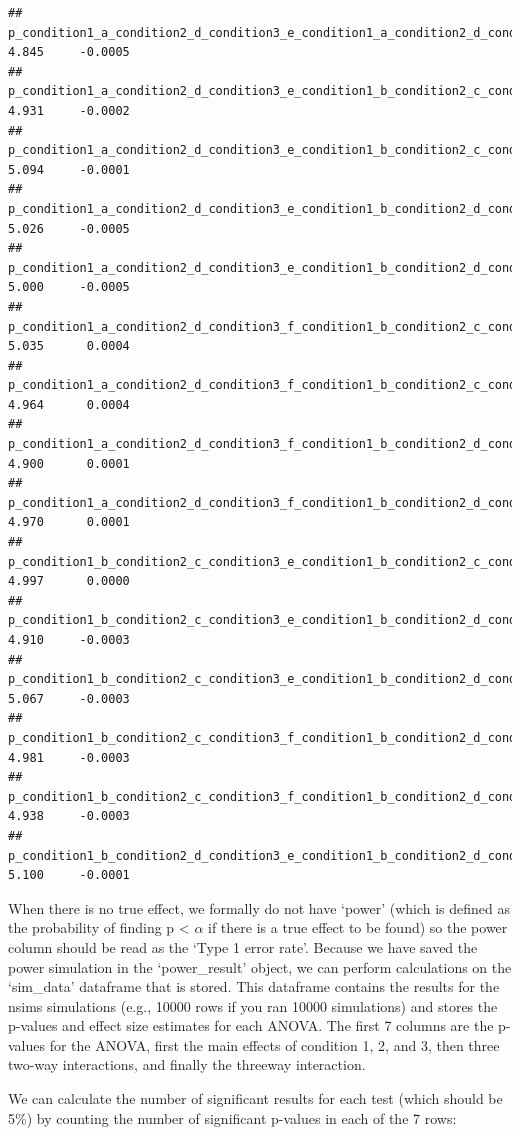 \documentclass[]{article}
\begin{document}
\begin{verbatim}
## p_condition1_a_condition2_d_condition3_e_condition1_a_condition2_d_condition3_f 4.845     -0.0005
## p_condition1_a_condition2_d_condition3_e_condition1_b_condition2_c_condition3_e 4.931     -0.0002
## p_condition1_a_condition2_d_condition3_e_condition1_b_condition2_c_condition3_f 5.094     -0.0001
## p_condition1_a_condition2_d_condition3_e_condition1_b_condition2_d_condition3_e 5.026     -0.0005
## p_condition1_a_condition2_d_condition3_e_condition1_b_condition2_d_condition3_f 5.000     -0.0005
## p_condition1_a_condition2_d_condition3_f_condition1_b_condition2_c_condition3_e 5.035      0.0004
## p_condition1_a_condition2_d_condition3_f_condition1_b_condition2_c_condition3_f 4.964      0.0004
## p_condition1_a_condition2_d_condition3_f_condition1_b_condition2_d_condition3_e 4.900      0.0001
## p_condition1_a_condition2_d_condition3_f_condition1_b_condition2_d_condition3_f 4.970      0.0001
## p_condition1_b_condition2_c_condition3_e_condition1_b_condition2_c_condition3_f 4.997      0.0000
## p_condition1_b_condition2_c_condition3_e_condition1_b_condition2_d_condition3_e 4.910     -0.0003
## p_condition1_b_condition2_c_condition3_e_condition1_b_condition2_d_condition3_f 5.067     -0.0003
## p_condition1_b_condition2_c_condition3_f_condition1_b_condition2_d_condition3_e 4.981     -0.0003
## p_condition1_b_condition2_c_condition3_f_condition1_b_condition2_d_condition3_f 4.938     -0.0003
## p_condition1_b_condition2_d_condition3_e_condition1_b_condition2_d_condition3_f 5.100     -0.0001
\end{verbatim}

When there is no true effect, we formally do not have `power' (which is
defined as the probability of finding p \textless{} \(\alpha\) if there
is a true effect to be found) so the power column should be read as the
`Type 1 error rate'. Because we have saved the power simulation in the
`power\_result' object, we can perform calculations on the `sim\_data'
dataframe that is stored. This dataframe contains the results for the
nsims simulations (e.g., 10000 rows if you ran 10000 simulations) and
stores the p-values and effect size estimates for each ANOVA. The first
7 columns are the p-values for the ANOVA, first the main effects of
condition 1, 2, and 3, then three two-way interactions, and finally the
threeway interaction.

We can calculate the number of significant results for each test (which
should be 5\%) by counting the number of significant p-values in each of
the 7 rows:
\end{document}
